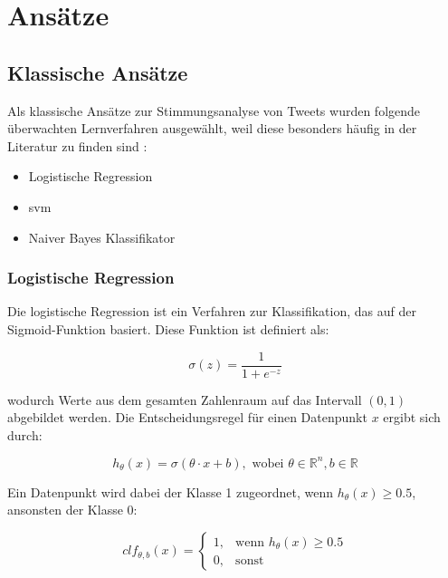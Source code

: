 \section{Ansätze}

\subsection{Klassische Ansätze}

Als klassische Ansätze zur Stimmungsanalyse von Tweets wurden folgende überwachten Lernverfahren ausgewählt, weil diese besonders häufig in der Literatur zu finden sind \cite{wankhade2022survey, medhat2014sentiment, zimbra2018state}:

\begin{itemize}
    \item Logistische Regression
    \item \gls{svm}
    \item Naiver Bayes Klassifikator
\end{itemize}


\subsubsection{Logistische Regression}

Die logistische Regression ist ein Verfahren zur Klassifikation, das auf der Sigmoid-Funktion basiert. Diese Funktion ist definiert als:

\begin{equation*}
    \sigma(z) = \frac{1}{1 + e^{-z}}
\end{equation*}

wodurch Werte aus dem gesamten Zahlenraum auf das Intervall $(0,1)$ abgebildet werden. Die Entscheidungsregel für einen Datenpunkt $x$ ergibt sich durch:

\begin{equation*}
    h_{\theta}(x) = \sigma(\theta \cdot x + b), \text{ wobei } \theta \in \mathbb{R}^{n}, b \in \mathbb{R}
\end{equation*}

Ein Datenpunkt wird dabei der Klasse 1 zugeordnet, wenn $h_{\theta}(x) \geq 0.5$, ansonsten der Klasse 0:

\begin{equation*}
    clf_{\theta, b}(x) =
    \begin{cases}
        1, & \text{wenn } h_{\theta}(x) \geq 0.5 \\
        0, & \text{sonst}
    \end{cases}
\end{equation*}

